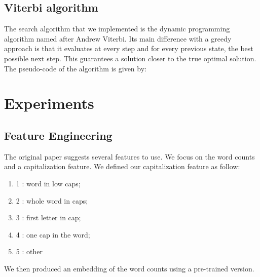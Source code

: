 \documentclass[11pt]{article}
\begin{document}
\subsection{Viterbi algorithm}

The search algorithm that we implemented is the dynamic programming algorithm named after Andrew Viterbi. Its main difference with a greedy approach is that it evaluates at every step and for every previous state, the best possible next step. This guarantees a solution closer to the true optimal solution. The pseudo-code of the algorithm is given by:\\

\begin{algorithmic}
    \EndIf{}
    \EndFor{}
    \EndFor{}
    \EndFor{}
    \EndProcedure{}
  \end{algorithmic}


\section{Experiments}

\subsection{Feature Engineering}

The original paper suggests several features to use. We focus on the word counts and a capitalization feature. We defined our capitalization feature as follow:
\begin{enumerate}
	\item 1 : word in low caps;
	\item 2 : whole word in caps;
	\item 3 : first letter in cap;
	\item 4 : one cap in the word;
	\item 5 : other
\end{enumerate}

We then produced an embedding of the word counts using a pre-trained version.
\end{document}
